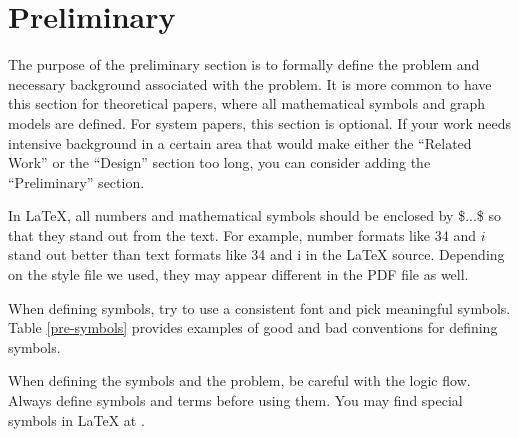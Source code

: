 \section{Preliminary}
\label{sec:pre}


The purpose of the preliminary section is to formally define the problem and necessary background associated with the problem.  It is more common to have this section for theoretical papers, where all mathematical symbols and graph models are defined.  For system papers, this section is optional.  If your work needs intensive background in a certain area that would make either the ``Related Work'' or the ``Design'' section too long, you can consider adding the ``Preliminary'' section.

In LaTeX, all numbers and mathematical symbols should be enclosed by \$...\$ so that they stand out from the text.  For example, number formats like $34$ and $i$ stand out better than text formats like 34 and i in the LaTeX source.  Depending on the style file we used, they may appear different in the PDF file as well.  

When defining symbols, try to use a consistent font and pick meaningful symbols. Table \ref{pre-symbols} provides examples of good and bad conventions for defining symbols.  


When defining the symbols and the problem, be careful with the logic flow.  Always define symbols and terms before using them.  You may find special symbols in \LaTeX $ $ at \cite{latex-symbols, latex-symbols-pdf, dextify}.
